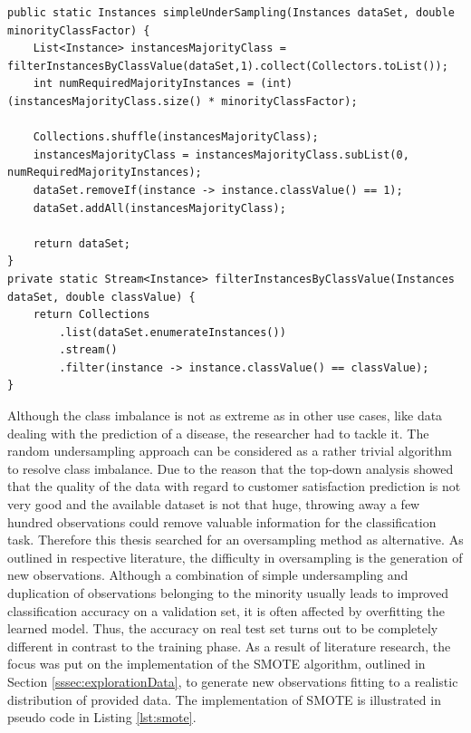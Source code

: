 \begin{lstlisting}[caption={Implementation of a random undersampling method}, label={lst:simpleUndersampling}]
public static Instances simpleUnderSampling(Instances dataSet, double minorityClassFactor) {
	List<Instance> instancesMajorityClass = filterInstancesByClassValue(dataSet,1).collect(Collectors.toList());
	int numRequiredMajorityInstances = (int) (instancesMajorityClass.size() * minorityClassFactor);
	
	Collections.shuffle(instancesMajorityClass);
	instancesMajorityClass = instancesMajorityClass.subList(0, numRequiredMajorityInstances);
	dataSet.removeIf(instance -> instance.classValue() == 1);
	dataSet.addAll(instancesMajorityClass);

	return dataSet;
}
private static Stream<Instance> filterInstancesByClassValue(Instances dataSet, double classValue) {
	return Collections
		.list(dataSet.enumerateInstances())
		.stream()
		.filter(instance -> instance.classValue() == classValue);
}
\end{lstlisting}

Although the class imbalance is not as extreme as in other use cases, like data dealing with the prediction of a disease, the researcher had to tackle it. The random undersampling approach can be considered as a rather trivial algorithm to resolve class imbalance. Due to the reason that the top-down analysis showed that the quality of the data with regard to customer satisfaction prediction is not very good and the available dataset is not that huge, throwing away a few hundred observations could remove valuable information for the classification task. Therefore this thesis searched for an oversampling method as alternative. As outlined in respective literature, the difficulty in oversampling is the generation of new observations. Although a combination of simple undersampling and duplication of observations belonging to the minority usually leads to improved classification accuracy on a validation set, it is often affected by overfitting the learned model. Thus, the accuracy on real test set turns out to be completely different in contrast to the training phase. As a result of literature research, the focus was put on the implementation of the SMOTE algorithm, outlined in Section \ref{sssec:explorationData}, to generate new observations fitting to a realistic distribution of provided data. The implementation of SMOTE is illustrated in pseudo code in Listing \ref{lst:smote}. 

